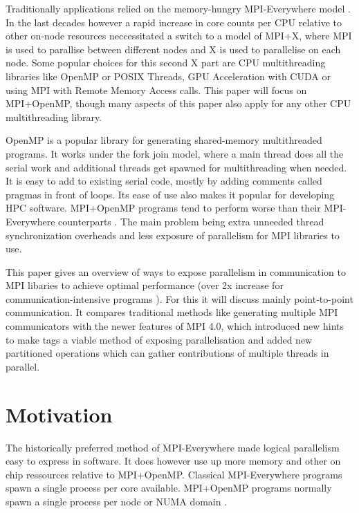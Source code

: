 \documentclass[sigconf]{acmart}
\begin{document}
Traditionally applications relied on the memory-hungry MPI-Everywhere model \cite{zambreLessonsLearned2022}.
In the last decades however a rapid increase in core counts per CPU relative to other on-node resources neccessitated a switch to a model of MPI+X,
where MPI is used to parallise between different nodes and X is used to parallelise on each node.
Some popular choices for this second X part are CPU multithreading libraries like OpenMP or POSIX Threads, GPU Acceleration with CUDA or using MPI with Remote Memory Access calls.
This paper will focus on MPI+OpenMP, though many aspects of this paper also apply for any other CPU multithreading library.

OpenMP is a popular library for generating shared-memory multithreaded programs.
It works under the fork join model, where a main thread does all the serial work and additional threads get spawned for multithreading when needed.
It is easy to add to existing serial code, mostly by adding comments called pragmas in front of loops.
Its ease of use also makes it popular for developing HPC software.
MPI+OpenMP programs tend to perform worse than their MPI-Everywhere counterparts \cite{zambreLessonsLearned2022}\cite{zambreLogicalParallel2021}.
The main problem being extra unneeded thread synchronization overheads \cite{zambreLessonsLearned2022} and less exposure of parallelism for MPI libraries to use.

This paper gives an overview of ways to expose parallelism in communication to MPI libaries to achieve optimal performance (over 2x increase for communication-intensive programs \cite{zambreLogicalParallel2021}).
For this it will discuss mainly point-to-point communication. It compares traditional methods like generating multiple MPI communicators with the newer features of MPI 4.0, which introduced new hints to make tags a viable method of exposing parallelisation and added new partitioned operations which can gather contributions of multiple threads in parallel.

\section{Motivation}
The historically preferred method of MPI-Everywhere made logical parallelism easy to express in software.
It does however use up more memory and other on chip ressources relative to MPI+OpenMP.
Classical MPI-Everywhere programs spawn a single process per core available.
MPI+OpenMP programs normally spawn a single process per node or NUMA domain \cite{zambreLessonsLearned2022}.
\end{document}
